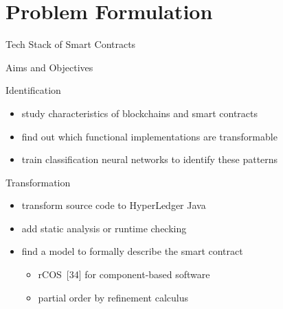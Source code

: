 \documentclass[xcolor=svgnames]{beamer}
\begin{document}
\section{Problem Formulation}

\begin{frame}{Tech Stack of Smart Contracts}



\end{frame}


\begin{frame}{Aims and Objectives}

Identification\\
\begin{itemize}
\item study characteristics of blockchains and smart contracts
\item find out which functional implementations are transformable
\item train classification neural networks to identify these patterns
\end{itemize}

Transformation\\
\begin{itemize}
\item transform source code to HyperLedger Java
\item add static analysis or runtime checking
\item find a model to formally describe the smart contract
	\begin{itemize}
	\item rCOS~[34] for component-based software
	\item partial order by refinement calculus
	\end{itemize}
\end{itemize}

\end{frame}
\end{document}
